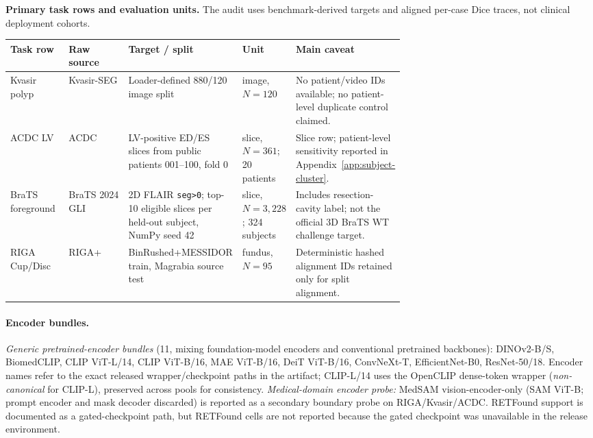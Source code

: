 \documentclass{article}
\begin{document}
\begin{center}
  \scriptsize
  \textbf{Primary task rows and evaluation units.} The audit uses benchmark-derived targets and aligned per-case Dice traces, not clinical deployment cohorts.\\[2pt]
  \setlength{\tabcolsep}{2.8pt}
  \begin{tabularx}{\linewidth}{p{0.15\linewidth}p{0.16\linewidth}p{0.23\linewidth}p{0.13\linewidth}Y}
    \toprule
    Task row & Raw source & Target / split & Unit & Main caveat \\
    \midrule
    Kvasir polyp & Kvasir-SEG \citep{kvasirseg} & Loader-defined 880/120 image split & image, $N{=}120$ & No patient/video IDs available; no patient-level duplicate control claimed. \\
    ACDC LV & ACDC \citep{acdc} & LV-positive ED/ES slices from public patients 001--100, fold 0 & slice, $N{=}361$; 20 patients & Slice row; patient-level sensitivity reported in Appendix~\ref{app:subject-cluster}. \\
    BraTS foreground & BraTS 2024 GLI \citep{brats2024gli,brats2024gli_challenge} & 2D FLAIR \texttt{seg>0}; top-10 eligible slices per held-out subject, NumPy seed 42 & slice, $N{=}3{,}228$; 324 subjects & Includes resection-cavity label; not the official 3D BraTS WT challenge target. \\
    RIGA Cup/Disc & RIGA+ \citep{riga,riga_data} & BinRushed+MESSIDOR train, Magrabia source test & fundus, $N{=}95$ & Deterministic hashed alignment IDs retained only for split alignment. \\
    \bottomrule
  \end{tabularx}
\end{center}

\paragraph{Encoder bundles.} \emph{Generic pretrained-encoder bundles} (11, mixing foundation-model encoders and conventional pretrained backbones): DINOv2-B/S, BiomedCLIP, CLIP ViT-L/14, CLIP ViT-B/16, MAE ViT-B/16, DeiT ViT-B/16, ConvNeXt-T, EfficientNet-B0, ResNet-50/18. Encoder names refer to the exact released wrapper/checkpoint paths in the artifact; CLIP-L/14 uses the OpenCLIP dense-token wrapper (\emph{non-canonical} for CLIP-L), preserved across pools for consistency. \emph{Medical-domain encoder probe:} MedSAM vision-encoder-only (SAM ViT-B; prompt encoder and mask decoder discarded) is reported as a secondary boundary probe on RIGA/Kvasir/ACDC. RETFound support is documented as a gated-checkpoint path, but RETFound cells are not reported because the gated checkpoint was unavailable in the release environment.
\end{document}
